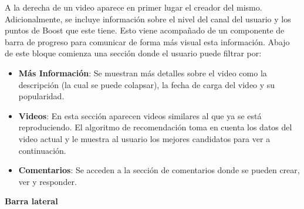 A la derecha de un video aparece en primer lugar el creador del mismo. Adicionalmente, se incluye información sobre el nivel del canal del usuario y los puntos de Boost que este tiene. Esto viene acompañado de un componente de barra de progreso para comunicar de forma más visual esta información. Abajo de este bloque comienza una sección donde el usuario puede filtrar por:
\begin{itemize}
  \item \textbf{Más Información}: Se muestran más detalles sobre el video como la descripción (la cual se puede colapsar), la fecha de carga del video y su popularidad.
  \item \textbf{Videos}: En esta sección aparecen videos similares al que ya se está reproduciendo. El algoritmo de recomendación toma en cuenta los datos del video actual y le muestra al usuario los mejores candidatos para ver a continuación.
  \item \textbf{Comentarios}: Se acceden a la sección de comentarios donde se pueden crear, ver y responder. 
\end{itemize}

\textbf{Barra lateral}

